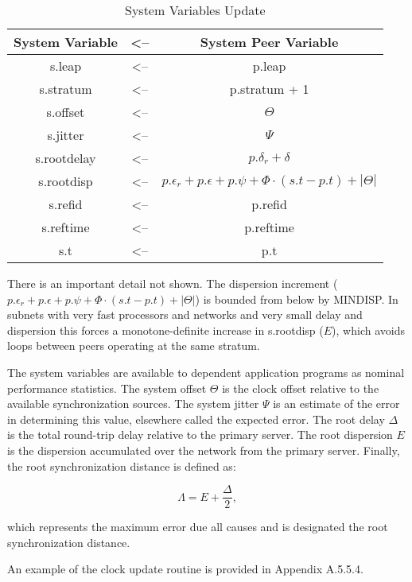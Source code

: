 \begin{table}[htb]
\center
\begin{tabular}{c | c | c}
System Variable & <-- & System Peer Variable \\
\hline
\hline
s.leap      & <-- & p.leap                    \\
s.stratum   & <-- & p.stratum + 1             \\
s.offset    & <-- & $ \Theta $                     \\
s.jitter    & <-- & $ \Psi $                       \\
s.rootdelay & <-- & $ p.\delta_r + \delta $         \\
s.rootdisp  & <-- & $ p.\epsilon_r + p.\epsilon + p.\psi + \Phi \cdot (s.t - p.t) + |\Theta| $ \\
s.refid     & <-- & p.refid                   \\
s.reftime   & <-- & p.reftime                 \\
s.t         & <-- & p.t                       \\
\hline
\end{tabular}
\label{system_variables_update}
\caption{System Variables Update}
\end{table}

There is an important detail not shown.  The dispersion increment
($ p.\epsilon_r + p.\epsilon + p.\psi + \Phi \cdot (s.t - p.t) + |\Theta| $) is bounded from
below by MINDISP.  In subnets with very fast processors and networks
and very small delay and dispersion this forces a monotone-definite
increase in s.rootdisp ($ E $), which avoids loops between peers
operating at the same stratum.

The system variables are available to dependent application programs
as nominal performance statistics.  The system offset $ \Theta $ is the
clock offset relative to the available synchronization sources.  The
system jitter $ \Psi $ is an estimate of the error in determining this
value, elsewhere called the expected error.  The root delay $ \Delta $ is
the total round-trip delay relative to the primary server.  The root
dispersion $ E $ is the dispersion accumulated over the network
from the primary server.  Finally, the root synchronization distance
is defined as:

$$
\Lambda = E + \frac{\Delta}{2},
$$

which represents the maximum error due all causes and is designated
the root synchronization distance.

An example of the clock update routine is provided in
Appendix A.5.5.4.

